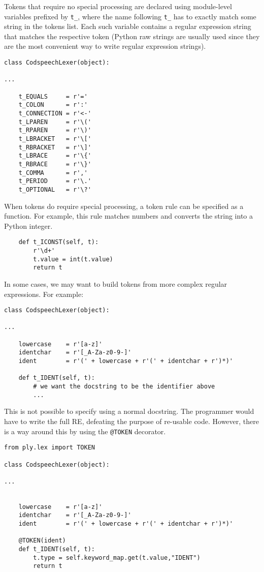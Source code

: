Tokens that require no special processing are declared using
module-level variables prefixed by \texttt{t_}, where the name
following \texttt{t_} has to exactly match some string in the tokens
list. Each such variable contains a regular expression string that
matches the respective token (Python raw strings are usually used
since they are the most convenient way to write regular expression
strings).
\begin{lstlisting}
class CodspeechLexer(object):

...

    t_EQUALS     = r'='
    t_COLON      = r':'
    t_CONNECTION = r'<-'
    t_LPAREN     = r'\('
    t_RPAREN     = r'\)'
    t_LBRACKET   = r'\['
    t_RBRACKET   = r'\]'
    t_LBRACE     = r'\{'
    t_RBRACE     = r'\}'
    t_COMMA      = r','
    t_PERIOD     = r'\.'
    t_OPTIONAL   = r'\?'
\end{lstlisting}

When tokens do require special processing, a token rule can be
specified as a function. For example, this rule matches numbers and
converts the string into a Python integer.
\begin{lstlisting}
    def t_ICONST(self, t):
        r'\d+'
        t.value = int(t.value)
        return t
\end{lstlisting}

In some cases, we may want to build tokens from more complex regular
expressions. For example:
\begin{lstlisting}
class CodspeechLexer(object):

...

    lowercase    = r'[a-z]'
    identchar    = r'[_A-Za-z0-9-]'
    ident        = r'(' + lowercase + r'(' + identchar + r')*)'

    def t_IDENT(self, t):
        # we want the docstring to be the identifier above
        ...
\end{lstlisting}

\noindent This is not possible to specify using a normal docstring. The
programmer would have to write the full RE, defeating the purpose of
re-usable code. However, there is a way around this by using the
\texttt{@TOKEN} decorator.
\begin{lstlisting}
from ply.lex import TOKEN

class CodspeechLexer(object):

...


    lowercase    = r'[a-z]'
    identchar    = r'[_A-Za-z0-9-]'
    ident        = r'(' + lowercase + r'(' + identchar + r')*)'

    @TOKEN(ident)
    def t_IDENT(self, t):
        t.type = self.keyword_map.get(t.value,"IDENT")
        return t
\end{lstlisting}


